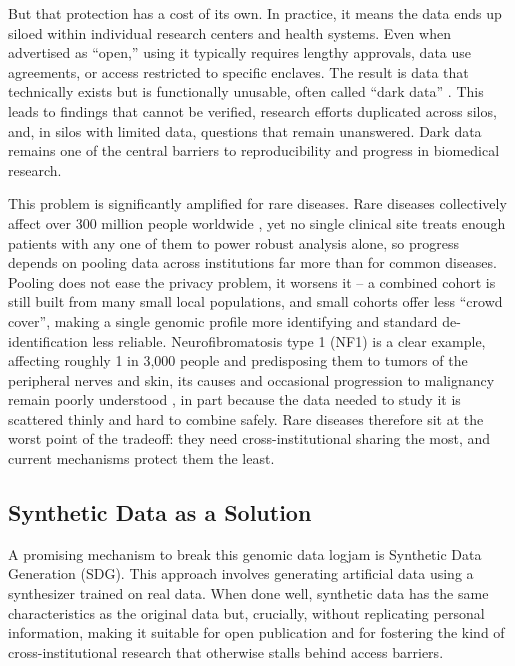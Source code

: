 \documentclass[webpdf,contemporary,large]{oup-authoring-template}%
\theoremstyle{thmstyleone}%
\theoremstyle{thmstyletwo}%
\theoremstyle{thmstylethree}%
\begin{document}
But that protection has a cost of its own. In practice, it means the data ends up siloed within individual research centers and health systems. Even when advertised as ``open,'' using it typically requires lengthy approvals, data use agreements, or access restricted to specific enclaves. The result is data that technically exists but is functionally unusable, often called ``dark data'' \citep{watson2023delivering,mcdermott2021reproducibility}. This leads to findings that cannot be verified, research efforts duplicated across silos, and, in silos with limited data, questions that remain unanswered. Dark data remains one of the central barriers to reproducibility and progress in biomedical research.

This problem is significantly amplified for rare diseases. Rare diseases collectively affect over 300 million people worldwide \citep{lancetgh2024rarediseases}, yet no single clinical site treats enough patients with any one of them to power robust analysis alone, so progress depends on pooling data across institutions far more than for common diseases. Pooling does not ease the privacy problem, it worsens it -- a combined cohort is still built from many small local populations, and small cohorts offer less ``crowd cover'', making a single genomic profile more identifying and standard de-identification less reliable. Neurofibromatosis type 1 (NF1) is a clear example, affecting roughly 1 in 3{,}000 people and predisposing them to tumors of the peripheral nerves and skin, its causes and occasional progression to malignancy remain poorly understood \citep{rasmussen2000nf1}, in part because the data needed to study it is scattered thinly and hard to combine safely. Rare diseases therefore sit at the worst point of the tradeoff: they need cross-institutional sharing the most, and current mechanisms protect them the least.

\subsection{Synthetic Data as a Solution}

A promising mechanism to break this genomic data logjam is Synthetic Data Generation (SDG). This approach involves generating artificial data using a synthesizer trained on real data. When done well, synthetic data has the same characteristics as the original data but, crucially, without replicating personal information, making it suitable for open publication and for fostering the kind of cross-institutional research that otherwise stalls behind access barriers.
\end{document}
